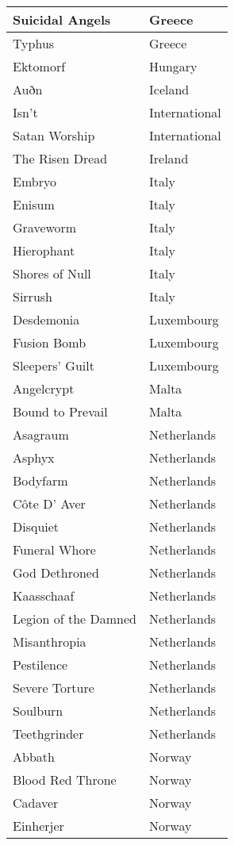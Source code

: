 \documentclass[12pt, a4paper, twoside]{report}
\begin{document}
\begin{center}
\begin{longtable}{|p{5cm}|p{5cm}|}
Suicidal Angels & Greece \\ \hline
Typhus & Greece \\ \hline
Ektomorf & Hungary \\ \hline
Auðn & Iceland \\ \hline
Isn't & International \\ \hline
Satan Worship & International \\ \hline
The Risen Dread & Ireland \\ \hline
Embryo & Italy \\ \hline
Enisum & Italy \\ \hline
Graveworm & Italy \\ \hline
Hierophant & Italy \\ \hline
Shores of Null & Italy \\ \hline
Sirrush & Italy \\ \hline
Desdemonia & Luxembourg \\ \hline
Fusion Bomb & Luxembourg \\ \hline
Sleepers' Guilt & Luxembourg \\ \hline
Angelcrypt & Malta \\ \hline
Bound to Prevail & Malta \\ \hline
Asagraum & Netherlands \\ \hline
Asphyx & Netherlands \\ \hline
Bodyfarm & Netherlands \\ \hline
Côte D' Aver & Netherlands \\ \hline
Disquiet & Netherlands \\ \hline
Funeral Whore & Netherlands \\ \hline
God Dethroned & Netherlands \\ \hline
Kaasschaaf & Netherlands \\ \hline
Legion of the Damned & Netherlands \\ \hline
Misanthropia & Netherlands \\ \hline
Pestilence & Netherlands \\ \hline
Severe Torture & Netherlands \\ \hline
Soulburn & Netherlands \\ \hline
Teethgrinder & Netherlands \\ \hline
Abbath & Norway \\ \hline
Blood Red Throne & Norway \\ \hline
Cadaver & Norway \\ \hline
Einherjer & Norway \\ \hline

\end{longtable}
\end{center}
\end{document}
